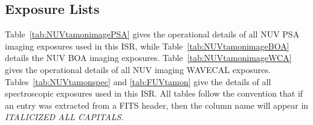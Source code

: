 \clearpage
\subsection{Exposure Lists}\label{subsec:elists}

Table~\ref{tab:NUVtamonimagePSA} gives the operational details of all NUV PSA imaging exposures used in this ISR, while Table~\ref{tab:NUVtamonimageBOA} details the NUV BOA imaging exposures.
Table~\ref{tab:NUVtamonimageWCA} gives the operational details of all NUV imaging WAVECAL exposures.
Tables~\ref{tab:NUVtamonspec} and \ref{tab:FUVtamon} give the details of all spectroscopic exposures used in this ISR.
All tables follow the convention that if an entry was extracted from a FITS header, then the column name will appear in \textit{ITALICIZED ALL CAPITALS}.\\

